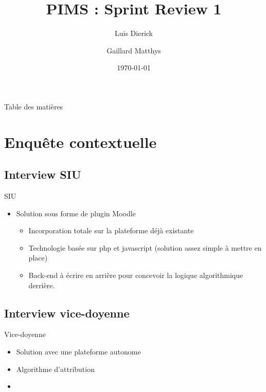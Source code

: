 \documentclass[numbering=fraction]{beamer}
\title{PIMS : Sprint Review 1}
\author[PIMS]{Luis Dierick \and Gaillard Matthys}
\institute{Université de Namur}
\date{\today}
\begin{document}
\begin{frame}[plain]{}
    \maketitle
\end{frame}

\begin{frame}{Table des matières}
    \tableofcontents
\end{frame}

\section{Enquête contextuelle}
\subsection{Interview SIU}

\begin{frame}{SIU}
    \begin{itemize}
        \item Solution sous forme de plugin Moodle
        \begin{itemize}
            \item Incorporation totale sur la plateforme déjà existante
            \item Technologie basée sur php et javascript (solution assez simple à mettre en place)
            \item Back-end à écrire en arrière pour concevoir la logique algorithmique derrière.
        \end{itemize}
    \end{itemize}
\end{frame}

\subsection{Interview vice-doyenne}


\begin{frame}{Vice-doyenne}
\begin{itemize}
    \item Solution avec une plateforme autonome
    \item Algorithme d'attribution
    \item 
\end{itemize}
\end{frame}
\end{document}

